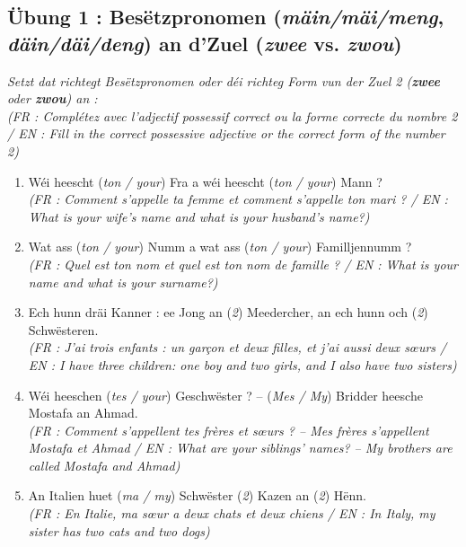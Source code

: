 \subsection*{Übung 1 : Besëtzpronomen (\textit{mäin/mäi/meng}, \textit{däin/däi/deng}) an d'Zuel \frqq{} (\textit{zwee} vs. \textit{zwou})}
\textit{Setzt dat richtegt Besëtzpronomen oder déi richteg Form vun der Zuel 2 (\textbf{zwee} oder \textbf{zwou}) an :} \\
\textit{\small(FR : Complétez avec l'adjectif possessif correct ou la forme correcte du nombre 2 / EN : Fill in the correct possessive adjective or the correct form of the number 2)}

\begin{enumerate}
    \item Wéi heescht \underline{\hspace{2.2cm}} (\textit{ton / your}) Fra a wéi heescht \underline{\hspace{2.2cm}} (\textit{ton / your}) Mann ? \\
    \small\textit{(FR : Comment s'appelle ta femme et comment s'appelle ton mari ? / EN : What is your wife's name and what is your husband's name?)}
    \item Wat ass \underline{\hspace{2.2cm}} (\textit{ton / your}) Numm a wat ass \underline{\hspace{2.2cm}} (\textit{ton / your}) Familljennumm ? \\
    \small\textit{(FR : Quel est ton nom et quel est ton nom de famille ? / EN : What is your name and what is your surname?)}
    \item Ech hunn dräi Kanner : ee Jong an \underline{\hspace{2.2cm}} (\textit{2}) Meedercher, an ech hunn och \underline{\hspace{2.2cm}} (\textit{2}) Schwësteren. \\
    \small\textit{(FR : J'ai trois enfants : un garçon et deux filles, et j'ai aussi deux sœurs / EN : I have three children: one boy and two girls, and I also have two sisters)}
    \item Wéi heeschen \underline{\hspace{2.2cm}} (\textit{tes / your}) Geschwëster ? -- \underline{\hspace{2.2cm}} (\textit{Mes / My}) Bridder heesche Mostafa an Ahmad. \\
    \small\textit{(FR : Comment s'appellent tes frères et sœurs ? -- Mes frères s'appellent Mostafa et Ahmad / EN : What are your siblings' names? -- My brothers are called Mostafa and Ahmad)}
    \item An Italien huet \underline{\hspace{2.2cm}} (\textit{ma / my}) Schwëster \underline{\hspace{2.2cm}} (\textit{2}) Kazen an \underline{\hspace{2.2cm}} (\textit{2}) Hënn. \\
    \small\textit{(FR : En Italie, ma sœur a deux chats et deux chiens / EN : In Italy, my sister has two cats and two dogs)}
\end{enumerate}

